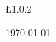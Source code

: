 \begin{center}	
\begin{bfseries}
\bigskip
\bigskip

 \L{1.0.2} 

\bigskip
\bigskip

\today

\end{bfseries}
\end{center}
